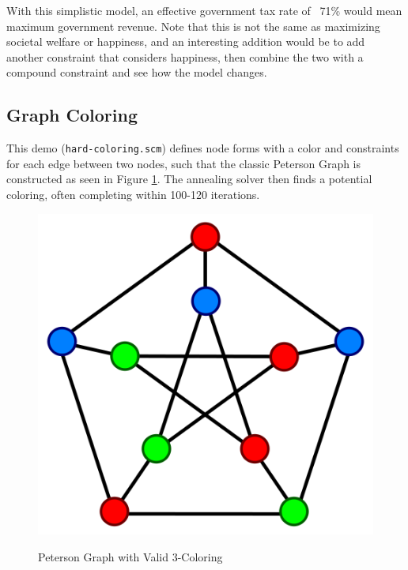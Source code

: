 \documentclass[12pt,a4paper]{article}
\begin{document}
With this simplistic model, an effective government tax rate of ~71\% would mean maximum government revenue.  Note that this is not the same as maximizing societal welfare or happiness, and an interesting addition would be to add another constraint that considers happiness, then combine the two with a compound constraint and see how the model changes.

\subsection{Graph Coloring}

This demo (\texttt{hard-coloring.scm}) defines node forms with a color and constraints for each edge between two nodes, such that the classic Peterson Graph is constructed as seen in Figure \ref{fig:Peterson}.  The annealing solver then finds a potential coloring, often completing within 100-120 iterations.
\begin{figure}[H]
\caption{Peterson Graph with Valid 3-Coloring}
\centering
\includegraphics[scale=.5]{peterson.png}
\label{fig:Peterson}
\end{figure}
\end{document}
